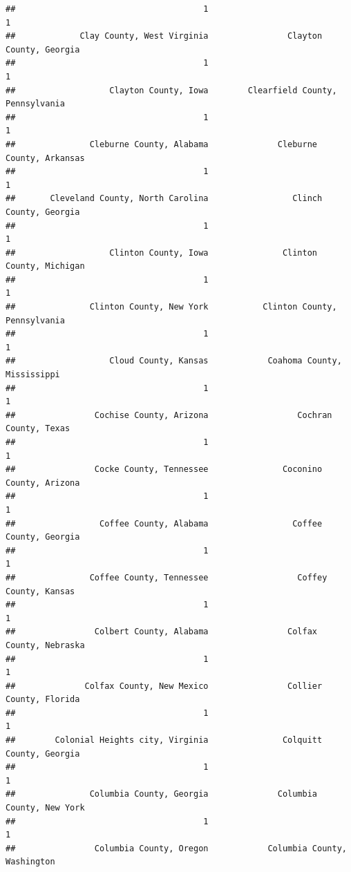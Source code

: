 \documentclass[
]{article}
\begin{document}
\begin{verbatim}
##                                      1                                      1 
##             Clay County, West Virginia                Clayton County, Georgia 
##                                      1                                      1 
##                   Clayton County, Iowa        Clearfield County, Pennsylvania 
##                                      1                                      1 
##               Cleburne County, Alabama              Cleburne County, Arkansas 
##                                      1                                      1 
##       Cleveland County, North Carolina                 Clinch County, Georgia 
##                                      1                                      1 
##                   Clinton County, Iowa               Clinton County, Michigan 
##                                      1                                      1 
##               Clinton County, New York           Clinton County, Pennsylvania 
##                                      1                                      1 
##                   Cloud County, Kansas            Coahoma County, Mississippi 
##                                      1                                      1 
##                Cochise County, Arizona                  Cochran County, Texas 
##                                      1                                      1 
##                Cocke County, Tennessee               Coconino County, Arizona 
##                                      1                                      1 
##                 Coffee County, Alabama                 Coffee County, Georgia 
##                                      1                                      1 
##               Coffee County, Tennessee                  Coffey County, Kansas 
##                                      1                                      1 
##                Colbert County, Alabama                Colfax County, Nebraska 
##                                      1                                      1 
##              Colfax County, New Mexico                Collier County, Florida 
##                                      1                                      1 
##        Colonial Heights city, Virginia               Colquitt County, Georgia 
##                                      1                                      1 
##               Columbia County, Georgia              Columbia County, New York 
##                                      1                                      1 
##                Columbia County, Oregon            Columbia County, Washington 

\end{verbatim}
\end{document}
